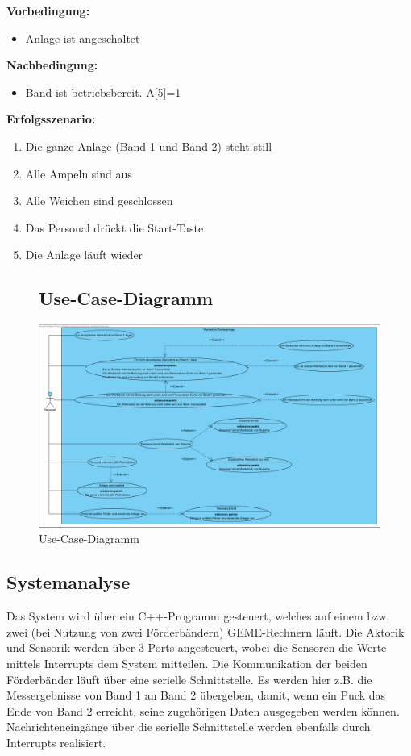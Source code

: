 \documentclass[oneside,a4paper,titlepage]{scrartcl}              %
\begin{document}
\textbf{Vorbedingung:}
\begin{itemize}
  \item Anlage ist angeschaltet
\end{itemize}

\textbf{Nachbedingung:}
\begin{itemize}
  \item Band ist betriebsbereit. A[5]=1
\end{itemize}

\textbf{Erfolgsszenario:}
\begin{enumerate}
  \item Die ganze Anlage (Band 1 und Band 2) steht still
  \item Alle Ampeln sind aus
  \item Alle Weichen sind geschlossen
  \item Das Personal drückt die Start-Taste
  \item Die Anlage läuft wieder
\end{enumerate}

\begin{figure}[p]
  \subsection{Use-Case-Diagramm}
  \centering\includegraphics[angle=90,scale=0.7]{imgs/UseCases.png}
  \caption{Use-Case-Diagramm}
\end{figure}

\subsection{Systemanalyse}
Das System wird über ein C++-Programm gesteuert, welches auf einem bzw. zwei (bei Nutzung von zwei Förderbändern) GEME-Rechnern läuft. Die Aktorik und Sensorik werden über 3 Ports angesteuert, wobei die Sensoren die Werte mittels Interrupts dem System mitteilen.\newline
Die Kommunikation der beiden Förderbänder läuft über eine serielle Schnittstelle. Es werden hier z.B. die Messergebnisse von Band 1 an Band 2 übergeben, damit, wenn ein Puck das Ende von Band 2 erreicht, seine zugehörigen Daten ausgegeben werden können. Nachrichteneingänge über die serielle Schnittstelle werden ebenfalls durch Interrupts realisiert.
\end{document}
